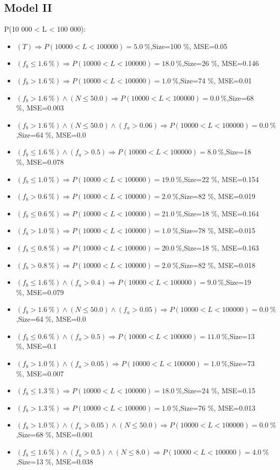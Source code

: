 \documentclass[numbered]{CSL}
\begin{document}
\subsection{Model II}
P(10 000 < L < 100 000):
\begin{itemize}
\item $(T) \Rightarrow P(10 000 < L < 100 000) = 5.0~\%$,\hfill Size=100 \%, MSE=0.05
\item $(f_b \leq 1.6~\%) \Rightarrow P(10 000 < L < 100 000) = 18.0~\%$,\hfill Size=26 \%, MSE=0.146
\item $(f_b > 1.6~\%) \Rightarrow P(10 000 < L < 100 000) = 1.0~\%$,\hfill Size=74 \%, MSE=0.01
\item $(f_b > 1.6~\%) \land (N \leq 50.0) \Rightarrow P(10 000 < L < 100 000) = 0.0~\%$,\hfill Size=68 \%, MSE=0.003
\item $(f_b > 1.6~\%) \land (N \leq 50.0) \land (f_a > 0.06) \Rightarrow P(10 000 < L < 100 000) = 0.0~\%$,\hfill Size=64 \%, MSE=0.0
\item $(f_b \leq 1.6~\%) \land (f_a > 0.5) \Rightarrow P(10 000 < L < 100 000) = 8.0~\%$,\hfill Size=18 \%, MSE=0.078
\item $(f_b \leq 1.0~\%) \Rightarrow P(10 000 < L < 100 000) = 19.0~\%$,\hfill Size=22 \%, MSE=0.154
\item $(f_b > 0.6~\%) \Rightarrow P(10 000 < L < 100 000) = 2.0~\%$,\hfill Size=82 \%, MSE=0.019
\item $(f_b \leq 0.6~\%) \Rightarrow P(10 000 < L < 100 000) = 21.0~\%$,\hfill Size=18 \%, MSE=0.164
\item $(f_b > 1.0~\%) \Rightarrow P(10 000 < L < 100 000) = 1.0~\%$,\hfill Size=78 \%, MSE=0.015
\item $(f_b \leq 0.8~\%) \Rightarrow P(10 000 < L < 100 000) = 20.0~\%$,\hfill Size=18 \%, MSE=0.163
\item $(f_b > 0.8~\%) \Rightarrow P(10 000 < L < 100 000) = 2.0~\%$,\hfill Size=82 \%, MSE=0.018
\item $(f_b \leq 1.6~\%) \land (f_a > 0.4) \Rightarrow P(10 000 < L < 100 000) = 9.0~\%$,\hfill Size=19 \%, MSE=0.079
\item $(f_b > 1.6~\%) \land (N \leq 50.0) \land (f_a > 0.05) \Rightarrow P(10 000 < L < 100 000) = 0.0~\%$,\hfill Size=64 \%, MSE=0.0
\item $(f_b \leq 0.6~\%) \land (f_a > 0.5) \Rightarrow P(10 000 < L < 100 000) = 11.0~\%$,\hfill Size=13 \%, MSE=0.1
\item $(f_b > 1.0~\%) \land (f_a > 0.05) \Rightarrow P(10 000 < L < 100 000) = 1.0~\%$,\hfill Size=73 \%, MSE=0.007
\item $(f_b \leq 1.3~\%) \Rightarrow P(10 000 < L < 100 000) = 18.0~\%$,\hfill Size=24 \%, MSE=0.15
\item $(f_b > 1.3~\%) \Rightarrow P(10 000 < L < 100 000) = 1.0~\%$,\hfill Size=76 \%, MSE=0.013
\item $(f_b > 1.0~\%) \land (f_a > 0.05) \land (N \leq 50.0) \Rightarrow P(10 000 < L < 100 000) = 0.0~\%$,\hfill Size=68 \%, MSE=0.001
\item $(f_b \leq 1.6~\%) \land (f_a > 0.5) \land (N \leq 8.0) \Rightarrow P(10 000 < L < 100 000) = 4.0~\%$,\hfill Size=13 \%, MSE=0.038
\end{itemize}
\end{document}
